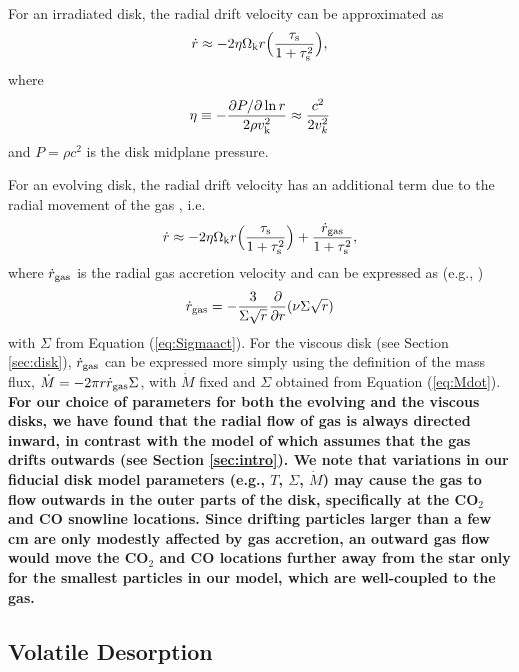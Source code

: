 \documentclass[apj]{emulateapj}
\begin{document}
For an irradiated disk, the radial drift velocity can be approximated as
\begin{equation}
\label{eq:rdotpas}
\dot{r} \approx -2 \eta \Omega_{\rm k} r \Big(\frac{\tau_{\rm s}}{1+\tau_{\rm s}^2}\Big),
\end{equation}
where
\begin{equation}
\label{eq:eta}
\eta \equiv - \frac{\partial P/\partial \ln r}{2 \rho v_{\rm k}^2} \approx \frac{c^2}{2 v_k^2}
\end{equation}
and $P = \rho c^2$ is the disk midplane pressure. 

For an evolving disk, the radial drift velocity has an additional term due to the radial movement of the gas \citep{birnstiel12}, i.e.
\begin{equation}
\label{eq:rdotact}
\dot{r} \approx -2 \eta \Omega_{\rm k} r \Big(\frac{\tau_{\rm s}}{1+\tau_{\rm s}^2}\Big) + \frac{\dot{r}_{\rm gas}}{1+\tau_{\rm s}^2},
\end{equation}
where $\dot{r}_{\rm gas}$ is the radial gas accretion velocity and can be expressed as (e.g., \citealt{fkr02})
\begin{equation}
\label{eq:vgas}
\dot{r}_{\rm gas} = - \frac{3}{\Sigma \sqrt{r}} \frac{\partial}{\partial r}(\nu \Sigma \sqrt{r}) 
\end{equation}
with $\Sigma$ from Equation (\ref{eq:Sigmaact}). For the viscous disk (see Section \ref{sec:disk}), $\dot{r}_{\rm gas}$ can be expressed more simply using the definition of the mass flux, $\dot{M}=-2 \pi r \dot{r}_{\rm gas} \Sigma$, with $\dot{M}$ fixed and $\Sigma$ obtained from Equation (\ref{eq:Mdot}). \textbf{For our choice of parameters for both the evolving and the viscous disks, we have found that the radial flow of gas is always directed inward, in contrast with the model of \citet{alidib14} which assumes that the gas drifts outwards (see Section \ref{sec:intro}). We note that variations in our fiducial disk model parameters (e.g., $T$, $\Sigma$, $\dot{M}$) may cause the gas to flow outwards in the outer parts of the disk, specifically at the CO$_2$ and CO snowline locations. Since drifting particles larger than a few cm are only modestly affected by gas accretion, an outward gas flow would move the CO$_2$ and CO locations further away from the star only for the smallest particles in our model, which are well-coupled to the gas.}

\subsection{Volatile Desorption}
\label{sec:desorption}
\end{document}
